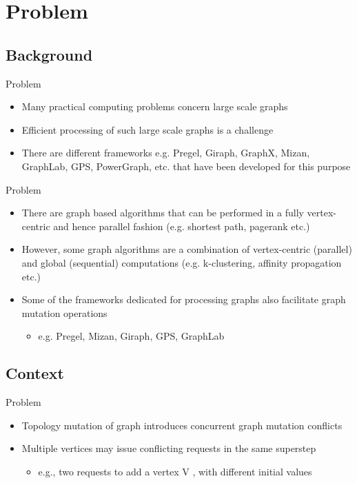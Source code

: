 \section{Problem}
\subsection{Background}
\begin{frame}{Problem}
  \begin{itemize}
    \item Many practical computing problems concern large scale graphs
    \item Efficient processing of such large scale graphs is a challenge
    \item  There are different frameworks e.g. Pregel, Giraph, GraphX, Mizan, GraphLab, GPS, PowerGraph, etc. that have been developed for this purpose
  \end{itemize}
  \end{frame}

  \begin{frame}{Problem}
    \begin{itemize}
    \item There are graph based algorithms that can be performed in a fully vertex-centric and hence parallel fashion (e.g. shortest path, pagerank etc.)
    \item However, some graph algorithms are a combination of vertex-centric (parallel) and global (sequential) computations (e.g. k-clustering, affinity propagation etc.)
    \item Some of the frameworks dedicated for processing graphs also facilitate graph mutation operations
        \begin{itemize}
          \item e.g. Pregel, Mizan, Giraph, GPS, GraphLab
        \end{itemize}
      \end{itemize}
    \end{frame}

\subsection{Context}
    \begin{frame}{Problem}
    \begin{itemize}
    \item Topology mutation of graph introduces concurrent graph mutation conflicts
    \newline
     \item Multiple vertices may issue conflicting requests in the same superstep
     	\begin{itemize}
		\item e.g., two requests to add a vertex V , with different initial values
	\end{itemize}
 \end{itemize}
\end{frame}


